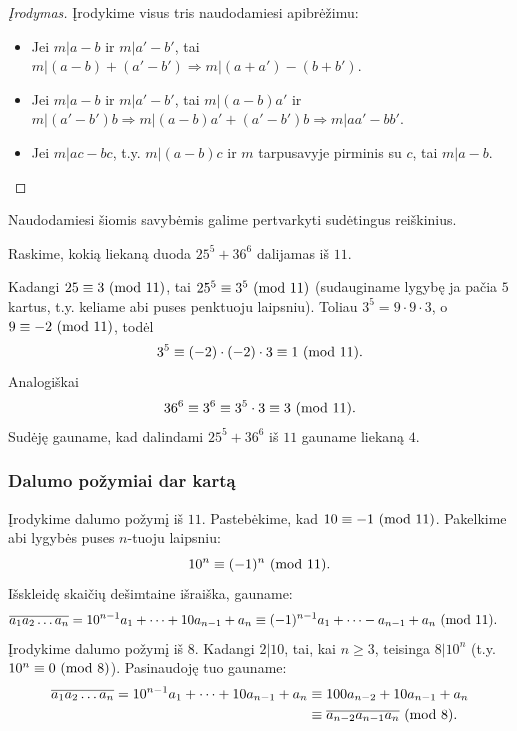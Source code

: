 \begin{proof}[Įrodymas]
Įrodykime visus tris naudodamiesi apibrėžimu: 
\begin{itemize}
  \item Jei $m|a-b$ ir $m|a'-b'$, tai $m|(a-b)+(a'-b') \Rightarrow
    m|(a+a')-(b+b').$
  \item Jei $m|a-b$ ir $m|a'-b'$, tai $m|(a-b)a'$ ir $m|(a'-b')b \Rightarrow
    m|(a-b)a' + (a'-b')b \Rightarrow m|aa' - bb'.$
  \item Jei $m|ac-bc$, t.y. $m|(a-b)c$ ir $m$ tarpusavyje pirminis su
    $c$, tai $m|a-b$. 
\end{itemize}
\end{proof}

Naudodamiesi šiomis savybėmis galime pertvarkyti sudėtingus reiškinius.

\begin{pav} 
  Raskime, kokią liekaną duoda $25^5 + 36^6$ dalijamas iš $11$.
\end{pav}

Kadangi $25 \equiv 3 \ (\text{mod } 11)$, tai $25^5 \equiv 3^5 \ (\text{mod } 11)$ (sudauginame
lygybę ja pačia $5$ kartus, t.y. keliame abi puses penktuoju laipsniu).
Toliau $3^5=9\cdot9\cdot3$, o $9 \equiv -2 \ (\text{mod } 11)$, todėl $$3^5 \equiv
(-2)\cdot(-2)\cdot 3 \equiv 1 \ (\text{mod } 11).$$ Analogiškai $$36^6 \equiv 3^6
\equiv 3^5 \cdot 3 \equiv 3 \ (\text{mod } 11).$$ Sudėję gauname, kad dalindami $25^5 +
36^6$ iš $11$ gauname liekaną $4$. 

\subsubsection{Dalumo požymiai dar kartą}

Įrodykime dalumo požymį iš $11$. Pastebėkime, kad $10 \equiv -1 \ (\text{mod } 11)$.
Pakelkime abi lygybės puses $n$-tuoju laipsniu:
$$10^n \equiv (-1)^n \ (\text{mod } 11).$$
Išskleidę skaičių dešimtaine išraiška, gauname:
\begin{align*}
  \overline{a_1a_2\dots a_n} & = 10^{n-1}a_1 + \cdots + 10a_{n-1}+a_n
   \equiv (-1)^{n-1}a_1 + \cdots - a_{n-1}+a_n \ (\text{mod } 11). 
\end{align*}
Įrodykime dalumo požymį iš $8$. Kadangi $2|10$, tai, kai $n\geq3$, teisinga $8|10^n$ (t.y. $10^n\equiv 0 \ (\text{mod } 8)$). 
Pasinaudoję tuo gauname: 
\begin{align*}
  \overline{a_1a_2\dots a_n} = 10^{n-1}a_1 + \cdots + 10a_{n-1}+a_n &
  \equiv 100a_{n-2}+ 10a_{n-1}+a_n \\ & \equiv \overline{a_{n-2}a_{n-1}a_n}
  \ (\text{mod } 8). 
\end{align*}



